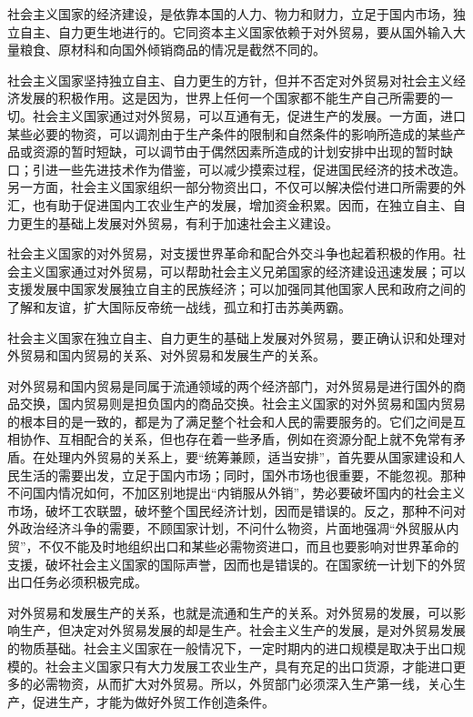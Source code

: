 \documentclass{book}
\begin{document}
社会主义国家的经济建设，是依靠本国的人力、物力和财力，立足于国内市场，独立自主、自力更生地进行的。它同资本主义国家依赖于对外贸易，要从国外输入大量粮食、原材科和向国外倾销商品的情况是截然不同的。

社会主义国家坚持独立自主、自力更生的方针，但并不否定对外贸易对社会主义经济发展的积极作用。这是因为，世界上任何一个国家都不能生产自己所需要的一切。社会主义国家通过对外贸易，可以互通有无，促进生产的发展。一方面，进口某些必要的物资，可以调剂由于生产条件的限制和自然条件的影响所造成的某些产品或资源的暂时短缺，可以调节由于偶然因素所造成的计划安排中出现的暂时缺口；引进一些先进技术作为借鉴，可以减少摸索过程，促进国民经济的技术改造。另一方面，社会主义国家组织一部分物资出口，不仅可以解决偿付进口所需要的外汇，也有助于促进国内工农业生产的发展，增加资金积累。因而，在独立自主、自力更生的基础上发展对外贸易，有利于加速社会主义建设。

社会主义国家的对外贸易，对支援世界革命和配合外交斗争也起着积极的作用。社会主义国家通过对外贸易，可以帮助社会主义兄弟国家的经济建设迅速发展；可以支援发展中国家发展独立自主的民族经济；可以加强同其他国家人民和政府之间的了解和友谊，扩大国际反帝统一战线，孤立和打击苏美两霸。

社会主义国家在独立自主、自力更生的基础上发展对外贸易，要正确认识和处理对外贸易和国内贸易的关系、对外贸易和发展生产的关系。

对外贸易和国内贸易是同属于流通领域的两个经济部门，对外贸易是进行国外的商品交换，国内贸易则是担负国内的商品交换。社会主义国家的对外贸易和国内贸易的根本目的是一致的，都是为了满足整个社会和人民的需要服务的。它们之间是互相协作、互相配合的关系，但也存在着一些矛盾，例如在资源分配上就不免常有矛盾。在处理内外贸易的关系上，要“统筹兼顾，适当安排”，首先要从国家建设和人民生活的需要出发，立足于国内市场；同时，国外市场也很重要，不能忽视。那种不问国内情况如何，不加区别地提出“内销服从外销”，势必要破坏国内的社会主义市场，破坏工农联盟，破坏整个国民经济计划，因而是错误的。反之，那种不问对外政治经济斗争的需要，不顾国家计划，不问什么物资，片面地强凋“外贸服从内贸”，不仅不能及时地组织出口和某些必需物资进口，而且也要影响对世界革命的支援，破坏社会主义国家的国际声誉，因而也是错误的。在国家统一计划下的外贸出口任务必须积极完成。

对外贸易和发展生产的关系，也就是流通和生产的关系。对外贸易的发展，可以影响生产，但决定对外贸易发展的却是生产。社会主义生产的发展，是对外贸易发展的物质基础。社会主义国家在一般情况下，一定时期内的进口规模是取决于出口规模的。社会主义国家只有大力发展工农业生产，具有充足的出口货源，才能进口更多的必需物资，从而扩大对外贸易。所以，外贸部门必须深入生产第一线，关心生产，促进生产，才能为做好外贸工作创造条件。
\end{document}
